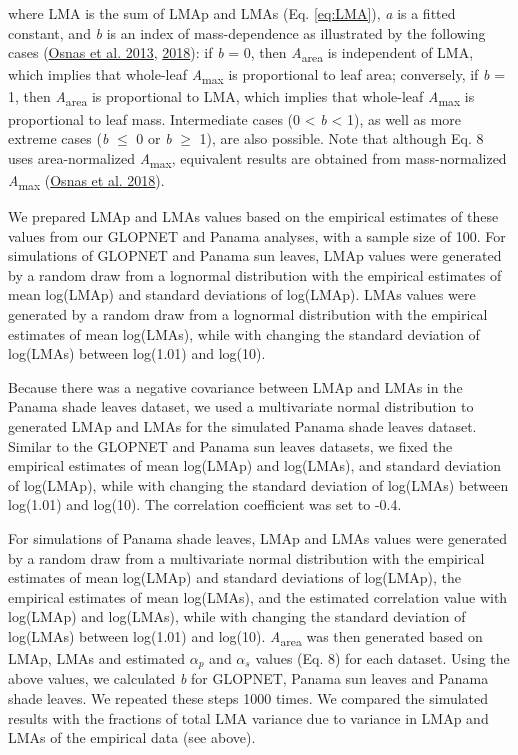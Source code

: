 \documentclass[
  12pt,
  a4paper,
,tablecaptionabove
]{scrartcl}
\begin{document}
where LMA is the sum of LMAp and LMAs (Eq. \eqref{eq:LMA}), \emph{a} is a fitted constant, and \emph{b} is an index of mass-dependence as illustrated by the following cases (\protect\hyperlink{ref-Osnas2013}{Osnas et al. 2013}, \protect\hyperlink{ref-Osnas2018}{2018}): if \emph{b} = 0, then \emph{A}\textsubscript{area} is independent of LMA, which implies that whole-leaf \emph{A}\textsubscript{max} is proportional to leaf area; conversely, if \emph{b} = 1, then \emph{A}\textsubscript{area} is proportional to LMA, which implies that whole-leaf \emph{A}\textsubscript{max} is proportional to leaf mass.
Intermediate cases (0 \textless{} \emph{b} \textless{} 1), as well as more extreme cases (\emph{b} \(\leq\) 0 or \emph{b} \(\geq\) 1), are also possible.
Note that although Eq. 8 uses area-normalized \emph{A}\textsubscript{max}, equivalent results are obtained from mass-normalized \emph{A}\textsubscript{max} (\protect\hyperlink{ref-Osnas2018}{Osnas et al. 2018}).

We prepared LMAp and LMAs values based on the empirical estimates of these values from our GLOPNET and Panama analyses, with a sample size of 100.
For simulations of GLOPNET and Panama sun leaves, LMAp values were generated by a random draw from a lognormal distribution with the empirical estimates of mean log(LMAp) and standard deviations of log(LMAp).
LMAs values were generated by a random draw from a lognormal distribution with the empirical estimates of mean log(LMAs), while with changing the standard deviation of log(LMAs) between log(1.01) and log(10).

Because there was a negative covariance between LMAp and LMAs in the Panama shade leaves dataset, we used a multivariate normal distribution to generated LMAp and LMAs for the simulated Panama shade leaves dataset.
Similar to the GLOPNET and Panama sun leaves datasets, we fixed the empirical estimates of mean log(LMAp) and log(LMAs), and standard deviation of log(LMAp), while with changing the standard deviation of log(LMAs) between log(1.01) and log(10).
The correlation coefficient was set to -0.4.

For simulations of Panama shade leaves, LMAp and LMAs values were generated by a random draw from a multivariate normal distribution with the empirical estimates of mean log(LMAp) and standard deviations of log(LMAp), the empirical estimates of mean log(LMAs), and the estimated correlation value with log(LMAp) and log(LMAs), while with changing the standard deviation of log(LMAs) between log(1.01) and log(10).
\emph{A}\textsubscript{area} was then generated based on LMAp, LMAs and estimated \(\alpha_p\) and \(\alpha_s\) values (Eq. 8) for each dataset.
Using the above values, we calculated \emph{b} for GLOPNET, Panama sun leaves and Panama shade leaves.
We repeated these steps 1000 times.
We compared the simulated results with the fractions of total LMA variance due to variance in LMAp and LMAs of the empirical data (see above).
\end{document}
